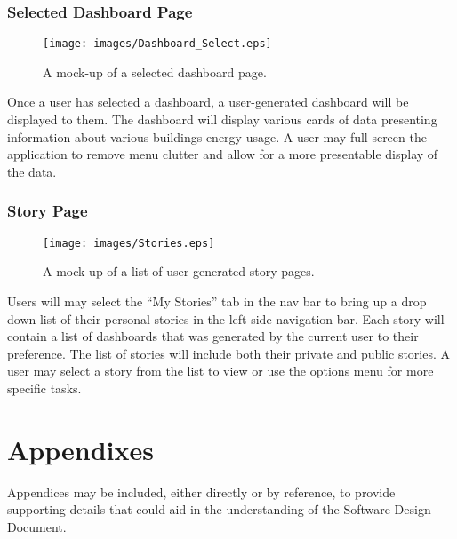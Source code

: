 \documentclass[journal,10pt,onecolumn,compsoc]{IEEEtran}
\begin{document}
    \subsubsection{Selected Dashboard Page}
    \begin{figure}[H]
        \centering
        \texttt{[image: images/Dashboard\_Select.eps]}
        \caption{A mock-up of a selected dashboard page.}
    \end{figure}
	Once a user has selected a dashboard, a user-generated dashboard will be displayed to them.
	The dashboard will display various cards of data presenting information about various buildings energy usage.
	A user may full screen the application to remove menu clutter and allow for a more presentable display of the data.
	
    \subsubsection{Story Page}
    \begin{figure}[H]
        \centering
        \texttt{[image: images/Stories.eps]}
        \caption{A mock-up of a list of user generated story pages.}
    \end{figure}
	Users will may select the ``My Stories'' tab in the nav bar to bring up a drop down list of their personal stories in the left side navigation bar.
	Each story will contain a list of dashboards that was generated by the current user to their preference. 
	The list of stories will include both their private and public stories.
	A user may select a story from the list to view or use the options menu for more specific tasks.
	
	
    \section{Appendixes}
    Appendices may be included, either directly or by reference, to provide supporting details
    that could aid in the understanding of the Software Design Document. 
    
    
\end{document}

